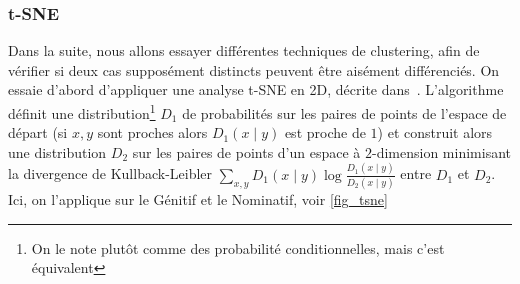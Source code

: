 \documentclass{cours}
\begin{document}
\subsubsection{t-SNE}\label{subsub:tsne}
Dans la suite, nous allons essayer différentes techniques de clustering, afin de vérifier si deux cas supposément distincts peuvent être aisément différenciés.
On essaie d'abord d'appliquer une analyse t-SNE en 2D, décrite dans~\cite{tSNE}.
L'algorithme définit une distribution\footnote{On le note plutôt comme des probabilité conditionnelles, mais c'est équivalent} $D_{1}$ de probabilités sur les paires de points de l'espace de départ (si $x, y$ sont proches alors $D_{1}(x \mid y)$ est proche de $1$) et construit alors une distribution $D_{2}$ sur les paires de points d'un espace à $2$-dimension minimisant la divergence de Kullback-Leibler $\sum_{x, y}D_{1}(x \mid y)\log\frac{D_{1}(x\mid y)}{D_{2}(x\mid y)}$ entre $D_{1}$ et $D_{2}$.
Ici, on l'applique sur le Génitif et le Nominatif, voir \ref{fig_tsne}
\end{document}
